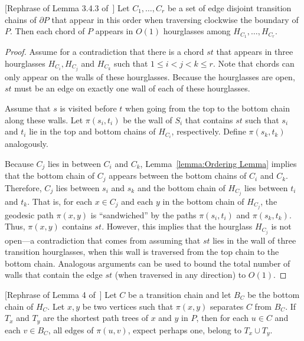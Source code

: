 \documentclass[a4paper,UKenglish]{lipics}
\newcommand{\p}[2]{\ensuremath{\pi(#1, #2)}}
\begin{document}
\begin{lemma}\label{lemma:Edges appear a constant number of times}
[Rephrase of Lemma 3.4.3 of~\cite{aronov1993furthest}]
Let $C_1, \ldots, C_r$ be a set of edge disjoint transition chains of $\partial P$ that appear in this order when traversing clockwise the boundary of $P$. Then each chord of $P$ appears in $O(1)$ hourglasses among $H_{C_1}, \ldots, H_{C_r}$.
\end{lemma}
\begin{proof}
Assume for a contradiction that there is a chord $st$ that appears in three hourglasses $H_{C_i}, H_{C_j}$ and $H_{C_k}$ such that $1\leq i < j < k\leq r$. 
Note that chords can only appear on the walls of these hourglasses. Because the hourglasses are open, $st$ must be an edge on exactly one wall of each of these hourglasses. 

Assume that $s$ is visited before $t$ when going from the top to the bottom chain along these walls.
Let $\p{s_i}{t_i}$ be the wall of $S_i$ that contains $st$ such that $s_i$ and $t_i$ lie in the top and bottom chains of $H_{C_i}$, respectively. Define $\p{s_k}{t_k}$ analogously.

Because  $C_j$ lies in between $C_i$ and $C_k$, Lemma~\ref{lemma:Ordering Lemma} implies that the bottom chain of $C_j$ appears between the bottom chains of $C_i$ and $C_k$. Therefore, $C_j$ lies between $s_i$ and $s_k$ and the bottom chain of $H_{C_j}$ lies between $t_i$ and $t_k$. 
That is, for each $x\in C_j$ and each $y$ in the bottom chain of $H_{C_j}$, the geodesic path $\p{x}{y}$ is ``sandwiched'' by the paths $\p{s_i}{t_i}$ and $\p{s_k}{t_k}$.
Thus, $\p{x}{y}$ contains $st$.
However, this implies that the hourglass $H_{C_j}$ is not open---a contradiction that comes from assuming that $st$ lies in the  wall of three transition hourglasses, when this wall is traversed from the top chain to the bottom chain. 
Analogous arguments can be used to bound the total number of walls that contain the edge $st$ (when traversed in any direction) to $O(1)$.
\end{proof}

\begin{lemma}\label{lemma:Suri's lemma}
[Rephrase of Lemma 4 of~\cite{suri1989computing}]
Let $C$ be a transition chain and let $B_C$ be the bottom chain of $H_C$.
Let $x,y$ be two vertices such that $\p{x}{y}$ separates $C$ from $B_C$. 
If $T_x$ and $T_y$ are the shortest path trees of $x$ and $y$ in $P$, then for each $u\in C$ and each $v\in B_C$, all edges of $\p{u}{v}$, expect perhaps one, belong to $T_x\cup T_y$.
\end{lemma}
\end{document}

